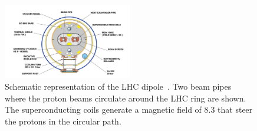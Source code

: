  \begin{figure}[h]
	\centering
	\includegraphics[width=0.5\textwidth]{2_ExperimentalSetup/Figures/lhc-pho-1998-341}
	\caption{Schematic representation of the LHC dipole~\cite{Jean-Luc:841539}. Two beam pipes where the proton beams circulate around the LHC ring are shown. The superconducting coils generate a magnetic field of 8.3 \tesla that steer the protons in the circular path. }
	\label{fig:dipole}
\end{figure}






